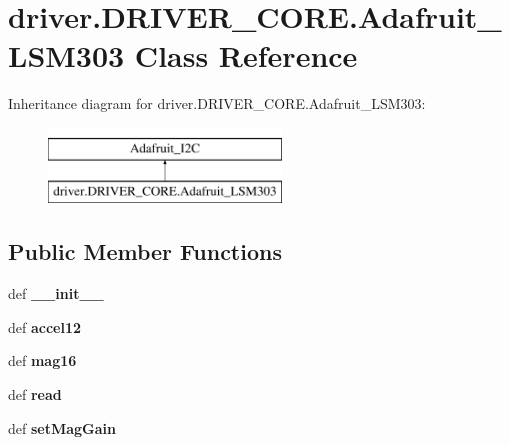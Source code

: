 \hypertarget{classdriver_1_1DRIVER__CORE_1_1Adafruit__LSM303}{}\section{driver.\+D\+R\+I\+V\+E\+R\+\_\+\+C\+O\+R\+E.\+Adafruit\+\_\+\+L\+S\+M303 Class Reference}
\label{classdriver_1_1DRIVER__CORE_1_1Adafruit__LSM303}
Inheritance diagram for driver.\+D\+R\+I\+V\+E\+R\+\_\+\+C\+O\+R\+E.\+Adafruit\+\_\+\+L\+S\+M303\+:\begin{figure}[H]
\begin{center}
\leavevmode
\includegraphics[height=2.000000cm]{classdriver_1_1DRIVER__CORE_1_1Adafruit__LSM303}
\end{center}
\end{figure}
\subsection*{Public Member Functions}
\begin{DoxyCompactItemize}
\item 
\hypertarget{classdriver_1_1DRIVER__CORE_1_1Adafruit__LSM303_ae5cf180d90f8866edaab4807bbe8f7bc}{}def {\bfseries \+\_\+\+\_\+init\+\_\+\+\_\+}\label{classdriver_1_1DRIVER__CORE_1_1Adafruit__LSM303_ae5cf180d90f8866edaab4807bbe8f7bc}

\item 
\hypertarget{classdriver_1_1DRIVER__CORE_1_1Adafruit__LSM303_a73f30f042346b5134d46ac40ea05287c}{}def {\bfseries accel12}\label{classdriver_1_1DRIVER__CORE_1_1Adafruit__LSM303_a73f30f042346b5134d46ac40ea05287c}

\item 
\hypertarget{classdriver_1_1DRIVER__CORE_1_1Adafruit__LSM303_a14da193d80d260f4d95a2636067685ce}{}def {\bfseries mag16}\label{classdriver_1_1DRIVER__CORE_1_1Adafruit__LSM303_a14da193d80d260f4d95a2636067685ce}

\item 
\hypertarget{classdriver_1_1DRIVER__CORE_1_1Adafruit__LSM303_a120ac3815a90e0b4ff49ae60958d568c}{}def {\bfseries read}\label{classdriver_1_1DRIVER__CORE_1_1Adafruit__LSM303_a120ac3815a90e0b4ff49ae60958d568c}

\item 
\hypertarget{classdriver_1_1DRIVER__CORE_1_1Adafruit__LSM303_a91452cc4c7ef0ab07e886843e1cc90dd}{}def {\bfseries set\+Mag\+Gain}\label{classdriver_1_1DRIVER__CORE_1_1Adafruit__LSM303_a91452cc4c7ef0ab07e886843e1cc90dd}

\end{DoxyCompactItemize}
